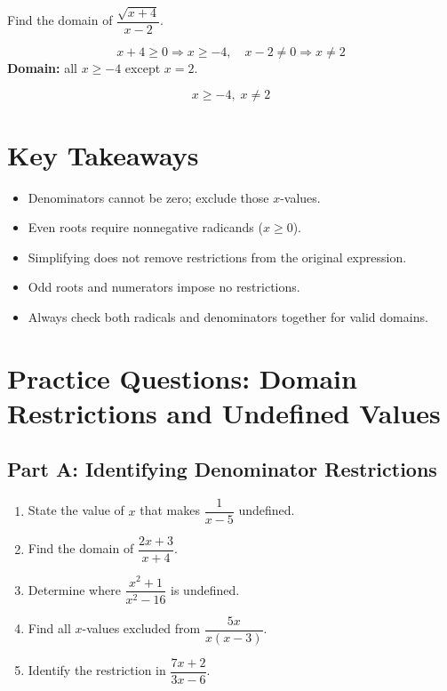 \documentclass[14pt]{extarticle}
\begin{document}
Find the domain of \(\dfrac{\sqrt{x + 4}}{x - 2}\).

\[
x + 4 \ge 0 \Rightarrow x \ge -4, \quad x - 2 \ne 0 \Rightarrow x \ne 2
\]
\textbf{Domain:} all \(x \ge -4\) except \(x = 2.\)

\[
\boxed{x \ge -4, \; x \ne 2}
\]

\section*{Key Takeaways}
\begin{itemize}
  \item Denominators cannot be zero; exclude those \(x\)-values.
  \item Even roots require nonnegative radicands (\(x \ge 0\)).
  \item Simplifying does not remove restrictions from the original expression.
  \item Odd roots and numerators impose no restrictions.
  \item Always check both radicals and denominators together for valid domains.
\end{itemize}

\newpage


\section*{Practice Questions: Domain Restrictions and Undefined Values}

\subsection*{Part A: Identifying Denominator Restrictions}
\begin{enumerate}
  \item State the value of \(x\) that makes \(\dfrac{1}{x - 5}\) undefined.
  \item Find the domain of \(\dfrac{2x + 3}{x + 4}\).
  \item Determine where \(\dfrac{x^2 + 1}{x^2 - 16}\) is undefined.
  \item Find all \(x\)-values excluded from \(\dfrac{5x}{x(x - 3)}\).
  \item Identify the restriction in \(\dfrac{7x + 2}{3x - 6}\).
\end{enumerate}
\end{document}
